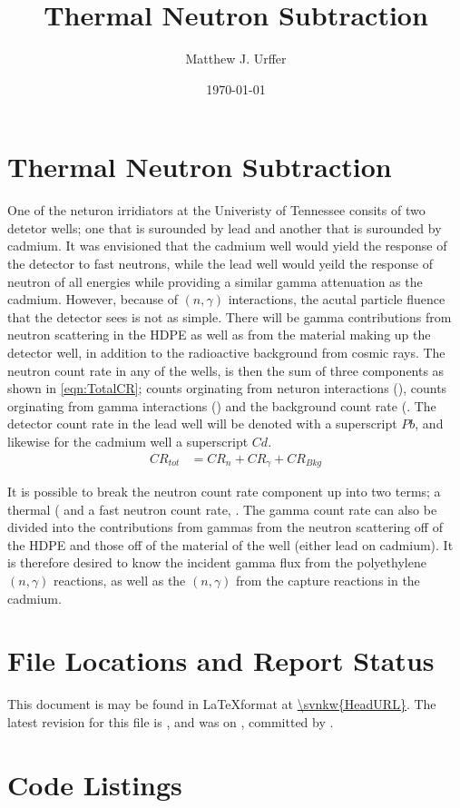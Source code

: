 \documentclass[draftcls,onecolumn]{IEEEtran}
\begin{document}
\title{Thermal Neutron Subtraction}
\author{Matthew J. Urffer}
\date{\today}
\maketitle

\printnomenclature
\printindex

\listoftodos
\tableofcontents
\listoffigures
\listoftables
\lstlistoflistings
\section{Thermal Neutron Subtraction}
One of the neturon irridiators at the Univeristy of Tennessee consits of two detetor wells; one that is surounded by lead and another that is surounded by cadmium.
It was envisioned that the cadmium well would yield the response of the detector to fast neutrons, while the lead well would yeild the response of neutron of all energies while providing a similar gamma attenuation as the cadmium.
However, because of $(n,\gamma)$ interactions, the acutal particle fluence that the detector sees is not as simple.
There will be gamma contributions from neutron scattering in the HDPE as well as from the material making up the detector well, in addition to the radioactive background from cosmic rays.
The neutron count rate in any of the wells,  is then the sum of three components as shown in \autoref{eqn:TotalCR}; counts orginating from neturon  interactions (), counts orginating from gamma interactions () and the background count rate (.
The detector count rate in the lead well will be denoted with a superscript $Pb$, and likewise for the cadmium well a superscript $Cd$.
\begin{align}
  \label{eqn:TotalCR}
  CR_{tot} &= CR_{n} + CR_{\gamma} + CR_{Bkg}
\end{align}

It is possible to break the neutron count rate component up into two terms; a thermal ( and a fast neutron count rate, .
The gamma count rate can also be divided into the contributions from gammas from the neutron scattering off of the HDPE and those off of the material of the well (either lead on cadmium).
It is therefore desired to know the incident gamma flux from the polyethylene $(n,\gamma)$ reactions, as well as the $(n,\gamma)$ from the capture reactions in the cadmium.


\pagebreak
\appendices
\section{File Locations and Report Status}
This document is may be found in \LaTeX format at \url{\svnkw{HeadURL}}.  
The latest revision for this file is \svnrev, and was on \svndate, committed by \svnauthor.
\section{Code Listings}
\end{document}
